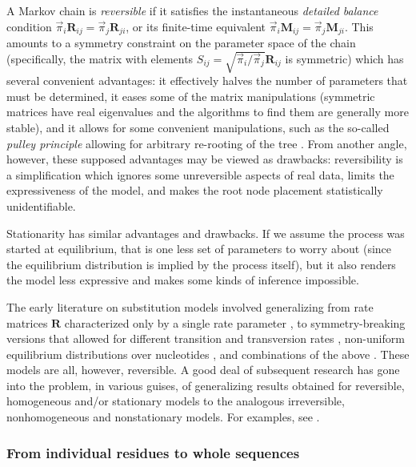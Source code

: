 \documentclass{bmcart}
\newcommand{\matr}[1]{\mathbf{#1}}
\newcommand{\ratematrix}{\matr{R}}
\newcommand{\eqmvec}{\vec{\pi}}
\newcommand{\condmatrix}{\matr{M}}
\begin{document}
A Markov chain is {\em reversible} if it satisfies the instantaneous {\em detailed balance} condition
$\eqmvec_i \ratematrix_{ij} = \eqmvec_j \ratematrix_{ji}$,
or its finite-time equivalent
$\eqmvec_i \condmatrix_{ij} = \eqmvec_j \condmatrix_{ji}$.
This amounts to a symmetry constraint on the parameter space of the chain
(specifically, the matrix with elements $S_{ij} = \sqrt{\eqmvec_i / \eqmvec_j} \ratematrix_{ij}$ is symmetric)
which has several convenient advantages: it effectively halves the number of parameters that must be
determined, it eases some of the matrix manipulations (symmetric matrices have real eigenvalues
and the algorithms to find them are generally more stable),
and it allows for some convenient manipulations, such as the so-called
{\em pulley principle} allowing for arbitrary re-rooting of the tree \cite{Felsenstein81}.
From another angle, however, these supposed advantages may be viewed as drawbacks:
reversibility is a simplification which ignores some unreversible aspects of real data,
limits the expressiveness of the model, and makes the root node placement statistically unidentifiable.

Stationarity has similar advantages and drawbacks.
If we assume the process was started at equilibrium, that is one less set of parameters to worry about
(since the equilibrium distribution is implied by the process itself), but it also renders the model
less expressive and makes some kinds of inference impossible.

The early literature on substitution models involved generalizing from rate matrices $\ratematrix$
characterized only by a single rate parameter \cite{JukesCantor69},
to symmetry-breaking versions that allowed for different transition and transversion rates
 \cite{Kimura80}, non-uniform equilibrium distributions over nucleotides \cite{Felsenstein81},
and combinations of the above \cite{HasegawaEtal85}.
These models are all, however, reversible.
A good deal of subsequent research has gone into the problem, in various guises, of generalizing results obtained
for reversible, homogeneous and/or stationary models to the analogous irreversible, nonhomogeneous and nonstationary models.
For examples, see \cite{pmid9600890,pmid22644340,pmid15210317,pmid27774306}.
\color{black}

\subsubsection*{From individual residues to whole sequences}
\end{document}
